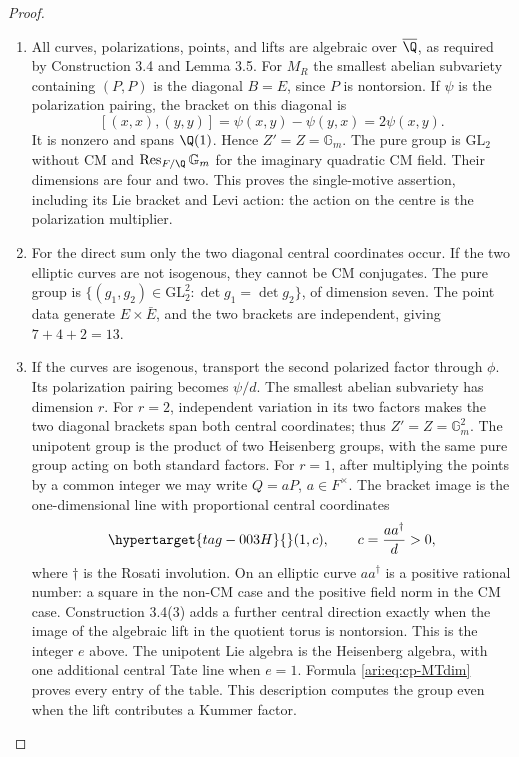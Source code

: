 \begin{proof}
\begin{enumerate}[label=\arabic*.,leftmargin=*]
\item All curves, polarizations, points, and lifts are algebraic over
$\overline\Q$, as required by Construction 3.4 and Lemma 3.5.
For $M_R$ the smallest abelian subvariety containing $(P,P)$ is
the diagonal $B=E$, since $P$ is nontorsion. If $\psi$ is the
polarization pairing, the bracket on this diagonal is
\[
 [(x,x),(y,y)]=\psi(x,y)-\psi(y,x)=2\psi(x,y).
\]
It is nonzero and spans $\Q(1)$. Hence $Z'=Z=\mathbb G_m$.
The pure group is $\mathrm{GL}_2$ without CM and
$\operatorname{Res}_{F/\Q}\mathbb G_m$ for the imaginary
quadratic CM field. Their dimensions are four and two.
This proves the single-motive assertion, including its Lie
bracket and Levi action: the action on the centre is the
polarization multiplier.

\item For the direct sum only the two diagonal central coordinates
occur. If the two elliptic curves are not isogenous, they
cannot be CM conjugates. The pure group is
$\{(g_1,g_2)\in\mathrm{GL}_2^2:\det g_1=\det g_2\}$,
of dimension seven. The point data generate $E\times\bar E$,
and the two brackets are independent, giving $7+4+2=13$.

\item If the curves are isogenous, transport the second polarized
factor through $\phi$. Its polarization pairing becomes
$\psi/d$. The smallest abelian subvariety has dimension $r$.
For $r=2$, independent variation in its two factors makes the
two diagonal brackets span both central coordinates; thus
$Z'=Z=\mathbb G_m^2$. The unipotent group is the product
of two Heisenberg groups, with the same pure group acting
on both standard factors.
For $r=1$, after multiplying the points by a common integer
we may write $Q=aP$, $a\in F^\times$. The bracket image is
the one-dimensional line with proportional central coordinates
\begin{equation}\hypertarget{tag-003H}{}\label{ari:eq:cp-positive-centre}
 (1,c),\qquad c=\frac{a a^\dagger}{d}>0,
\end{equation}
where $\dagger$ is the Rosati involution. On an elliptic curve
$aa^\dagger$ is a positive rational number: a square in the
non-CM case and the positive field norm in the CM case.
Construction 3.4(3) adds a further central direction exactly
when the image of the algebraic lift in the quotient torus
is nontorsion. This is the integer $e$ above.
The unipotent Lie algebra is the Heisenberg algebra, with one
additional central Tate line when $e=1$. Formula
\eqref{ari:eq:cp-MTdim} proves every entry of the table. This
description computes the group even when the lift contributes
a Kummer factor.
\end{enumerate}
\end{proof}